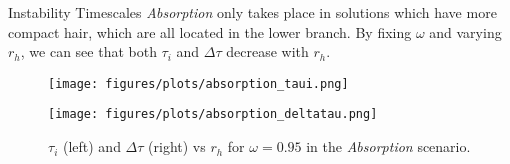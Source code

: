 \begin{block}{Instability Timescales}
\textit{Absorption} only takes place in solutions which have more compact hair, which are all located in the lower branch. By fixing $\omega$ and varying $r_h$, we can see that both $\tau_i$ and $\Delta \tau$ decrease with $r_h$.

\begin{figure}[h!]
    \centering
    \begin{minipage}[b]{0.49\textwidth}
        \centering
        \texttt{[image: figures/plots/absorption\_taui.png]}
    \end{minipage}
    \hfill
    \begin{minipage}[b]{0.49\textwidth}
        \centering
        \texttt{[image: figures/plots/absorption\_deltatau.png]}
    \end{minipage}
    \caption{$\tau_i$ (left) and $\Delta \tau$ (right) vs $r_h$ for $\omega = 0.95$ in the \textit{Absorption} scenario.}
\end{figure}

\vspace{-1.25em}  %

\end{block}
